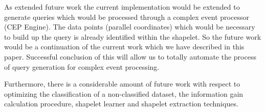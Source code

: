 \documentclass[letterpaper, 10 pt, conference]{IEEEtran}  %
\begin{document}
As extended future work the current implementation would be extended to generate queries which would be processed through a complex event processor (CEP Engine). The data points (parallel coordinates) which would be necessary to build up the query is already identified within the shapelet. So the future work would be a continuation of the current work which we have described in this paper. Successful conclusion of this will allow us to totally automate the process of query generation for complex event processing. 

Furthermore, there is a considerable amount of future work with respect to optimizing the classification of a non-classified dataset, the information gain calculation procedure, shapelet learner and shapelet extraction techniques. 


 

\end{document}
